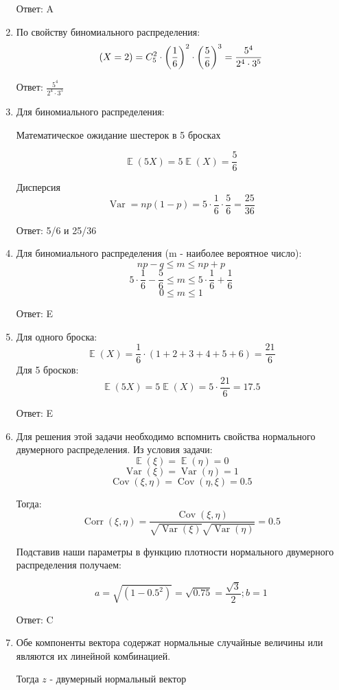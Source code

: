 \documentclass[a4paper]{article} %
\DeclareMathOperator{\Var}{Var}
\DeclareMathOperator{\Cov}{Cov}
\DeclareMathOperator{\Corr}{Corr}
\DeclareMathOperator{\E}{\mathbb{E}}
\let\P\relax
\DeclareMathOperator{\P}{\mathbb{P}}
\renewcommand{\leq}{\leqslant}
\begin{document}
\begin{enumerate}
    Ответ: A
    
    \item
    По свойству биномиального распределения:
    \[\P(X=2) = C_5^2 \cdot\left(\frac{1}{6}\right)^2 \cdot \left(\frac{5}{6}\right)^3 = \frac{5^4}{2^4\cdot3^5}\]
    
    Ответ: $\frac{5^4}{2^4\cdot3^5}$
    
    \item
    Для биномиального распределения:
   
    Математическое ожидание шестерок в 5 бросках
    
    \[\E(5X) = 5\E(X) = \frac{5}{6}\]
    
    Дисперсия
    \[\Var = np(1-p) = 5 \cdot \frac{1}{6} \cdot \frac{5}{6} = \frac{25}{36}\]
    
    Ответ: 5/6 и 25/36
    
    \item
    Для биномиального распределения (m - наиболее вероятное число):
    \[np-q \leq m \leq np+p\]
    \[5 \cdot \frac{1}{6} - \frac{5}{6} \leq m \leq 5 \cdot \frac{1}{6} + \frac{1}{6}\]
    \[0 \leq m \leq 1\]
    
    Ответ: E
    
    \item
    Для одного броска:
    \[\E(X) = \frac{1}{6}\cdot(1 + 2 + 3 + 4 + 5 + 6) = \frac{21}{6}\]
    Для 5 бросков:
    \[\E(5X) = 5\E(X) = 5 \cdot \frac{21}{6} = 17.5\]
    
    Ответ: E
    
    \item
    Для решения этой задачи необходимо вспомнить свойства нормального двумерного распределения.
    Из условия задачи:
    \[\E(\xi) = \E(\eta) = 0\]
    \[\Var(\xi) = \Var(\eta) = 1\]
    \[\Cov(\xi, \eta) = \Cov(\eta, \xi) = 0.5\]
    
    Тогда:
    \[\Corr(\xi, \eta) = \frac{\Cov(\xi, \eta)}{\sqrt{\Var(\xi)}\sqrt{\Var(\eta)}} = 0.5\]
    
    Подставив наши параметры в функцию плотности нормального двумерного распределения получаем:

    \[a = \sqrt{(1-0.5^2)} = \sqrt{0.75} = \frac{\sqrt{3}}{2}; b=1\] 
    
    Ответ: C
    
    \item
    Обе компоненты вектора содержат нормальные случайные величины или являются их линейной комбинацией.
    
    Тогда $z$ - двумерный нормальный вектор


\end{enumerate}
\end{document}
